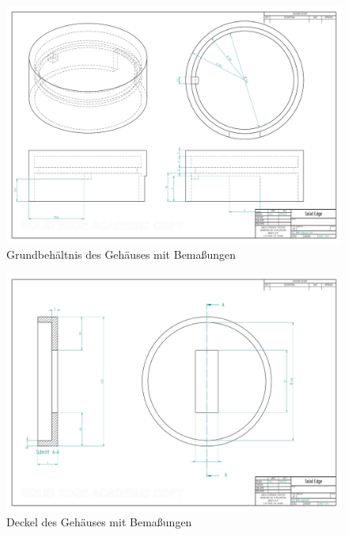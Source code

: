 \documentclass[a4paper,
DIV=13,
12pt,
BCOR=10mm,
department=FakEI,
parskip=half,
automark,
]{article}
\begin{document}
\begin{figure}[!hbpt]
 \begin{center} \includegraphics[width=1.4\textwidth,angle=-90]{gehauuse_4.pdf}
 \caption{Grundbehältnis des Gehäuses mit Bemaßungen}
 \label{fig:Grundbe}
  \end{center}
\end{figure}

\begin{figure}[!hbpt]
 \begin{center} \includegraphics[width=1.4\textwidth,angle=-90]{Deckel.pdf}
 \caption{Deckel des Gehäuses mit Bemaßungen}
 \label{fig:Deckel}
  \end{center}
\end{figure}

\newpage
\end{document}
